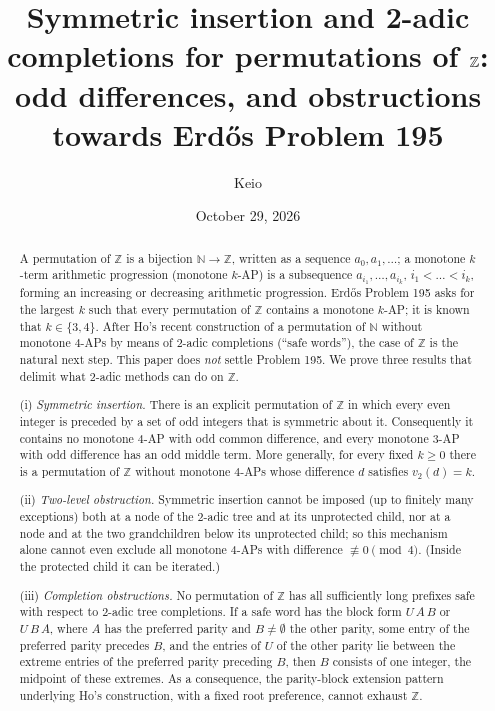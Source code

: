 \documentclass[11pt]{amsart}
\title[Symmetric insertion and 2-adic completions on $\Z$]{Symmetric insertion and 2-adic completions for permutations of $\Z$:\\ odd differences, and obstructions towards Erd\H{o}s Problem 195}
\author{Keio}
\date{October 29, 2026}
\theoremstyle{definition}
\theoremstyle{remark}
\newcommand{\Z}{\mathbb{Z}}
\newcommand{\N}{\mathbb{N}}
\begin{document}
\begin{abstract}
A permutation of $\Z$ is a bijection $\N\to\Z$, written as a sequence $a_0,a_1,\dots$; a monotone $k$-term arithmetic progression (monotone $k$-AP) is a subsequence $a_{i_1},\dots,a_{i_k}$, $i_1<\dots<i_k$, forming an increasing or decreasing arithmetic progression. Erd\H{o}s Problem 195 asks for the largest $k$ such that every permutation of $\Z$ contains a monotone $k$-AP; it is known that $k\in\{3,4\}$. After Ho's recent construction of a permutation of $\N$ without monotone $4$-APs by means of $2$-adic completions (``safe words''), the case of $\Z$ is the natural next step. This paper does \emph{not} settle Problem 195. We prove three results that delimit what $2$-adic methods can do on $\Z$.

(i) \emph{Symmetric insertion.} There is an explicit permutation of $\Z$ in which every even integer is preceded by a set of odd integers that is symmetric about it. Consequently it contains no monotone $4$-AP with odd common difference, and every monotone $3$-AP with odd difference has an odd middle term. More generally, for every fixed $k\ge0$ there is a permutation of $\Z$ without monotone $4$-APs whose difference $d$ satisfies $v_2(d)=k$.

(ii) \emph{Two-level obstruction.} Symmetric insertion cannot be imposed (up to finitely many exceptions) both at a node of the $2$-adic tree and at its unprotected child, nor at a node and at the two grandchildren below its unprotected child; so this mechanism alone cannot even exclude all monotone $4$-APs with difference $\not\equiv0\pmod 4$. (Inside the protected child it can be iterated.)

(iii) \emph{Completion obstructions.} No permutation of $\Z$ has all sufficiently long prefixes safe with respect to $2$-adic tree completions. If a safe word has the block form $U\,A\,B$ or $U\,B\,A$, where $A$ has the preferred parity and $B\neq\emptyset$ the other parity, some entry of the preferred parity precedes $B$, and the entries of $U$ of the other parity lie between the extreme entries of the preferred parity preceding $B$, then $B$ consists of one integer, the midpoint of these extremes. As a consequence, the parity-block extension pattern underlying Ho's construction, with a fixed root preference, cannot exhaust $\Z$.
\end{abstract}

\maketitle
\end{document}
